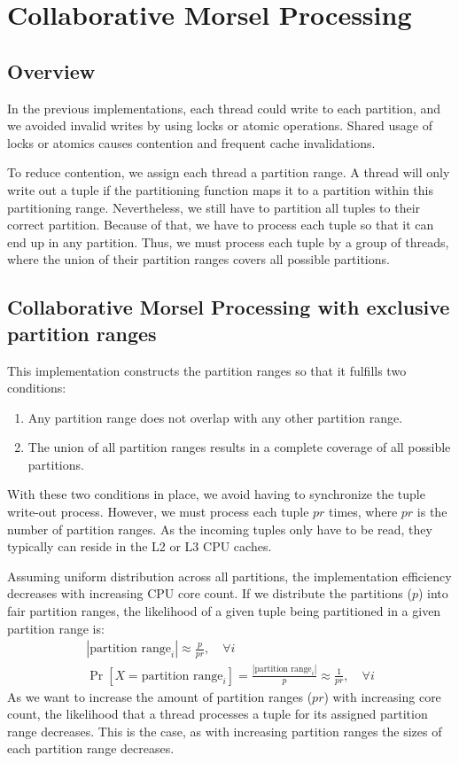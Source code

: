 \section{Collaborative Morsel Processing}\label{section-Collaborative-Morsel-Processing}
\subsection{Overview}
In the previous implementations, each thread could write to each partition, and we avoided invalid writes by using locks or atomic operations.
Shared usage of locks or atomics causes contention and frequent cache invalidations.

To reduce contention, we assign each thread a partition range.
A thread will only write out a tuple if the partitioning function maps it to a partition within this partitioning range.
Nevertheless, we still have to partition all tuples to their correct partition.
Because of that, we have to process each tuple so that it can end up in any partition.
Thus, we must process each tuple by a group of threads, where the union of their partition ranges covers all possible partitions.
\subsection{Collaborative Morsel Processing with exclusive partition ranges}\label{section-CMP-with_exclusive-partition-ranges}
This implementation constructs the partition ranges so that it fulfills two conditions:
\begin{enumerate}
  \item Any partition range does not overlap with any other partition range.
  \item The union of all partition ranges results in a complete coverage of all possible partitions.
\end{enumerate}
With these two conditions in place, we avoid having to synchronize the tuple write-out process.
However, we must process each tuple $pr$ times, where $pr$ is the number of partition ranges.
As the incoming tuples only have to be read, they typically can reside in the L2 or L3 \ac{CPU} caches.

Assuming uniform distribution across all partitions, the implementation efficiency decreases with increasing CPU core count.
If we distribute the partitions ($p$) into fair partition ranges, the likelihood of a given tuple being partitioned in a given partition range is:
\begin{gather}
  |\textrm{partition range}_i| \approx \frac{p}{pr},  \quad \forall i \\
  \Pr[X=\textrm{partition range}_i] = \frac{|\textrm{partition range}_i|}{p} \approx \frac{1}{pr},  \quad \forall i \label{equation-CMP-exclusive-partition-ranges}
\end{gather}
As we want to increase the amount of partition ranges ($pr$) with increasing core count, the likelihood that a thread processes a tuple for its assigned partition range decreases.
This is the case, as with increasing partition ranges the sizes of each partition range decreases.
